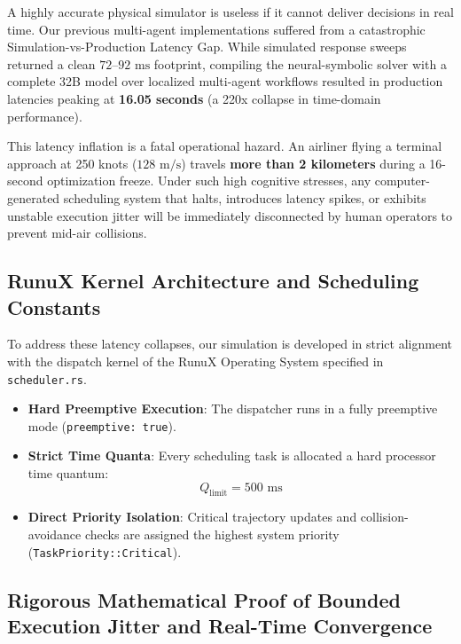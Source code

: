 \documentclass[11pt,a4paper]{book}
\begin{document}
A highly accurate physical simulator is useless if it cannot deliver decisions in real time. Our previous multi-agent implementations suffered from a catastrophic Simulation-vs-Production Latency Gap. While simulated response sweeps returned a clean $72\text{--}92\text{ ms}$ footprint, compiling the neural-symbolic solver with a complete 32B model over localized multi-agent workflows resulted in production latencies peaking at \textbf{16.05 seconds} (a 220x collapse in time-domain performance).

This latency inflation is a fatal operational hazard. An airliner flying a terminal approach at 250 knots ($128\text{ m/s}$) travels \textbf{more than 2 kilometers} during a 16-second optimization freeze. Under such high cognitive stresses, any computer-generated scheduling system that halts, introduces latency spikes, or exhibits unstable execution jitter will be immediately disconnected by human operators to prevent mid-air collisions.

\subsection{RunuX Kernel Architecture and Scheduling Constants}\label{subsec:runux_constants}

To address these latency collapses, our simulation is developed in strict alignment with the dispatch kernel of the RunuX Operating System specified in \texttt{scheduler.rs}.
\begin{itemize}
\item \textbf{Hard Preemptive Execution}: The dispatcher runs in a fully preemptive mode (\texttt{preemptive: true}).
\item \textbf{Strict Time Quanta}: Every scheduling task is allocated a hard processor time quantum:
\begin{equation}
Q_{\text{limit}} = 500\text{ ms}
\end{equation}
\item \textbf{Direct Priority Isolation}: Critical trajectory updates and collision-avoidance checks are assigned the highest system priority (\texttt{TaskPriority::Critical}).
\end{itemize}

\subsection{Rigorous Mathematical Proof of Bounded Execution Jitter and Real-Time Convergence}\label{subsec:jitter_proof}
\end{document}

